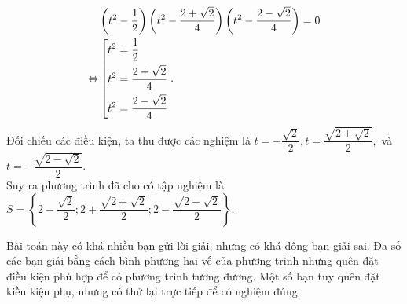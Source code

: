 \begin{bt}
{		{\allowdisplaybreaks
		\begin{align*}
			& \left( t^2-\dfrac{1}{2}\right)\left( t^2-\dfrac{2+\sqrt{2}}{4}\right)\left(t^2 -\dfrac{2-\sqrt{2}}{4}\right)=0\\
			\Leftrightarrow&\left[\begin{aligned}&t^2=\dfrac{1}{2}\\& t^2 =\dfrac{2+\sqrt{2}}{4}\\& t^2 =\dfrac{2-\sqrt{2}}{4}\end{aligned}\right..
		\end{align*}}Đối chiếu các điều kiện, ta thu được các nghiệm là 
		$t=-\dfrac{\sqrt{2}}{2}, t= \dfrac{\sqrt{2+\sqrt{2}}}{2},$ và $t=- \dfrac{\sqrt{2-\sqrt{2}}}{2}.$ \\
		Suy ra phương trình đã cho có tập nghiệm là $S= \left\{2-\dfrac{\sqrt{2}}{2}; 2+ \dfrac{\sqrt{2+\sqrt{2}}}{2}; 2- \dfrac{\sqrt{2-\sqrt{2}}}{2}  \right\}$.
		\begin{nx}
			Bài toán này có khá nhiều bạn gửi lời giải, nhưng có khá đông bạn giải sai. Đa số các bạn giải bằng cách bình phương hai vế của phương trình nhưng quên đặt điều kiện phù hợp để có phương trình tương đương. Một số bạn tuy quên đặt kiều kiện phụ, nhưng có thử lại trực tiếp để có nghiệm đúng.
		\end{nx}
}
\end{bt}

